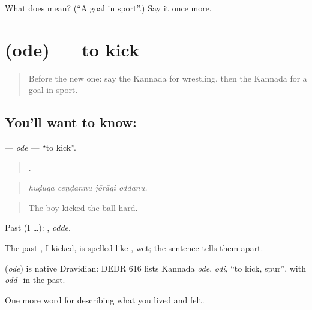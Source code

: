 \begin{tcolorbox}[breakable,colback=teal!4,colframe=teal!35!black,title={Before you move on}]
What does  mean? (\textquotedblleft{}A goal in sport\textquotedblright{}.) Say it once more.
\end{tcolorbox}
\section[\texorpdfstring{\kn{ಒದೆ} (ode)}{ಒದೆ (ode)}]{ (ode) — to kick}

\label{lesson:KA-C540-ode-kick}



\begin{quote}
Before the new one: say the Kannada for wrestling, then the Kannada for a goal in sport.
\end{quote}

\subsection*{You'll want to know: }
\textbf{} — \emph{ode} — \textquotedblleft{}to kick\textquotedblright{}.

\begin{quote}
   .
\end{quote}

\begin{quote}
\emph{huḍuga ceṇḍannu jōrāgi oddanu.}
\end{quote}

\begin{quote}
The boy kicked the ball hard.
\end{quote}

Past (I …): , \emph{odde}.

The past , I kicked, is spelled like , wet; the sentence tells them apart.

\begin{cousinweb}
\textbf{} (\emph{ode}) is native Dravidian: DEDR 616 lists Kannada \emph{ode}, \emph{odi}, \textquotedblleft{}to kick, spur\textquotedblright{}, with \emph{odd-} in the past.
\end{cousinweb}

\begin{grammarlens}[title={What you've built}]
One more word for describing what you lived and felt.
\end{grammarlens}

